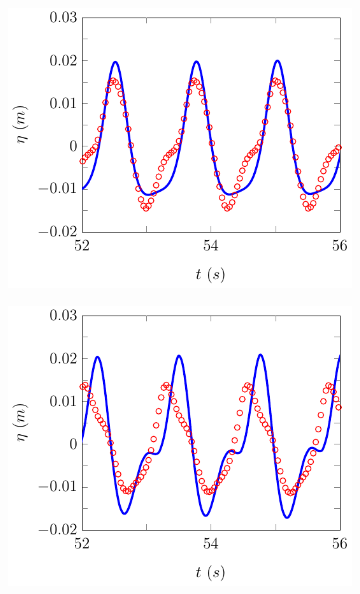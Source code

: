 \begin{figure}
	\centering
	\begin{subfigure}{0.5\textwidth}
		\includegraphics[width=\textwidth]{./chp6/figures/Experiment/Beji/sh/FDVMWG5.pdf}
		\vspace{0.5cm}
	\end{subfigure}%
	\begin{subfigure}{0.5\textwidth}
		\includegraphics[width=\textwidth]{./chp6/figures/Experiment/Beji/sh/FDVMWG6.pdf}
		\vspace{0.5cm}

\end{subfigure}
\end{figure}
